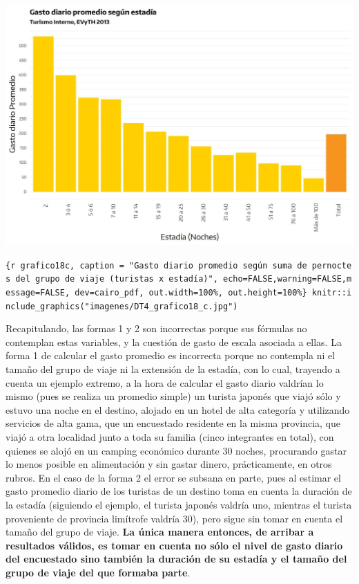\documentclass[
]{book}
\begin{document}
\begin{center}\includegraphics[width=1\linewidth,height=1\textheight]{imagenes/DT4_grafico18_b} \end{center}

\texttt{\{r\ grafico18c,\ caption\ =\ "Gasto\ diario\ promedio\ según\ suma\ de\ pernoctes\ del\ grupo\ de\ viaje\ (turistas\ x\ estadía)",\ echo=FALSE,warning=FALSE,message=FALSE,\ dev=\textquotesingle{}cairo\_pdf\textquotesingle{},\ out.width=\textquotesingle{}100\%\textquotesingle{},\ out.height=\textquotesingle{}100\%\textquotesingle{}\}\ knitr::include\_graphics("imagenes/DT4\_grafico18\_c.jpg")}

Recapitulando, las formas 1 y 2 son incorrectas porque sus fórmulas no contemplan estas variables, y la cuestión de gasto de escala asociada a ellas. La forma 1 de calcular el gasto promedio es incorrecta porque no contempla ni el tamaño del grupo de viaje ni la extensión de la estadía, con lo cual, trayendo a cuenta un ejemplo extremo, a la hora de calcular el gasto diario valdrían lo mismo (pues se realiza un promedio simple) un turista japonés que viajó sólo y estuvo una noche en el destino, alojado en un hotel de alta categoría y utilizando servicios de alta gama, que un encuestado residente en la misma provincia, que viajó a otra localidad junto a toda su familia (cinco integrantes en total), con quienes se alojó en un camping económico durante 30 noches, procurando gastar lo menos posible en alimentación y sin gastar dinero, prácticamente, en otros rubros. En el caso de la forma 2 el error se subsana en parte, pues al estimar el gasto promedio diario de los turistas de un destino toma en cuenta la duración de la estadía (siguiendo el ejemplo, el turista japonés valdría uno, mientras el turista proveniente de provincia limítrofe valdría 30), pero sigue sin tomar en cuenta el tamaño del grupo de viaje. \textbf{La única manera entonces, de arribar a resultados válidos, es tomar en cuenta no sólo el nivel de gasto diario del encuestado sino también la duración de su estadía y el tamaño del grupo de viaje del que formaba parte}.
\end{document}
